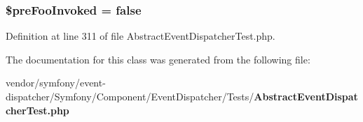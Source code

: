 \subsubsection[{\$pre\+Foo\+Invoked}]{\setlength{\rightskip}{0pt plus 5cm}\$pre\+Foo\+Invoked = false}\label{class_symfony_1_1_component_1_1_event_dispatcher_1_1_tests_1_1_test_event_listener_abc733edff44b3afafaf03415bc582384}


Definition at line 311 of file Abstract\+Event\+Dispatcher\+Test.\+php.



The documentation for this class was generated from the following file\+:\begin{DoxyCompactItemize}
\item 
vendor/symfony/event-\/dispatcher/\+Symfony/\+Component/\+Event\+Dispatcher/\+Tests/{\bf Abstract\+Event\+Dispatcher\+Test.\+php}\end{DoxyCompactItemize}

